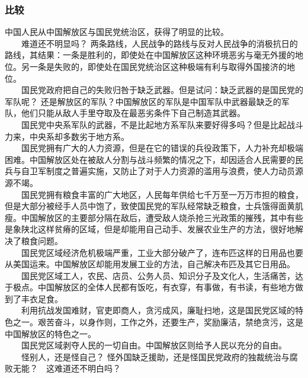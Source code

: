 \documentclass[cn,11pt,chinese]{elegantbook}
\def\myformat#1{\hfil\hfil #1}
\begin{document}
\subsubsection*{\myformat{比较}}
中国人民从中国解放区与国民党统治区，获得了明显的比较。\\
　　难道还不明显吗？ 两条路线，人民战争的路线与反对人民战争的消极抗日的路线，其结果：一条是胜利的，即使处在中国解放区这种环境恶劣与毫无外援的地位。另一条是失败的，即使处在国民党统治区这种极端有利与取得外国接济的地位。\\
　　国民党政府把自己的失败归咎于缺乏武器。但是试问：缺乏武器的是国民党的军队呢？ 还是解放区的军队？中国解放区的军队是中国军队中武器最缺乏的军队，他们只能从敌人手里夺取及在最恶劣条件下自己制造其武器。\\
　　国民党中央系军队的武器，不是比起地方系军队来要好得多吗？但是比起战斗力来，中央系却多数劣于地方系。\\
　　国民党拥有广大的人力资源，但是在它的错误的兵役政策下，人力补充却极端困难。中国解放区处在被敌人分割与战斗频繁的情况之下，却因适合人民需要的民兵与自卫军制度之普遍实施，又防止了对于人力资源的滥用与浪费，使人力动员源源不竭。\\
　　国民党拥有粮食丰富的广大地区，人民每年供给七千万至一万万市担的粮食，但是大部分被经手人员中饱了，致使国民党的军队经常缺乏粮食，士兵饿得面黄肌瘦。中国解放区的主要部分隔在敌后，遭受敌人烧杀抢三光政策的摧残，其中有些是象陕北这样贫瘠的区域，但是却能用自己动手、发展农业生产的方法，很好地解决了粮食问题。\\
　　国民党区域经济危机极端严重，工业大部分破产了，连布匹这样的日用品也要从美国运来。中国解放区却能用发展工业的方法，自己解决布匹及其它日用品。\\
　　国民党区域工人，农民、店员、公务人员、知识分子及文化人，生活痛苦，达于极点。中国解放区的全体人民都有饭吃，有衣穿，有事做，有书读，有些地方做到了丰衣足食。\\
　　利用抗战发国难财，官吏即商人，贪污成风，廉耻扫地，这是国民党区域的特色之一。艰苦奋斗，以身作则，工作之外，还要生产，奖励廉洁，禁绝贪污，这是中国解放区的特色之一。\\
　　国民党区域剥夺人民的一切自由。中国解放区则给予人民以充分的自由。\\
　　怪别人，还是怪自己？ 怪外国缺乏援助，还是怪国民党政府的独裁统治与腐败无能？　这难道还不明白吗？\\
\end{document}
